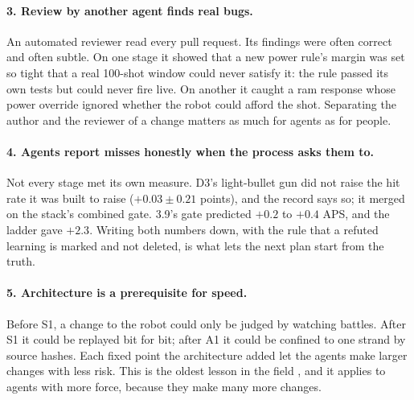 \documentclass[10pt,twocolumn]{article}
\begin{document}
\paragraph{3. Review by another agent finds real bugs.} An automated reviewer read every pull
request. Its findings were often correct and often subtle. On one stage it showed that a new
power rule's margin was set so tight that a real 100-shot window could never satisfy it: the rule
passed its own tests but could never fire live. On another it caught a ram response whose power
override ignored whether the robot could afford the shot. Separating the author and the reviewer
of a change matters as much for agents as for people.

\paragraph{4. Agents report misses honestly when the process asks them to.} Not every stage met its
own measure. D3's light-bullet gun did not raise the hit rate it was built to raise
($+0.03 \pm 0.21$ points), and the record says so; it merged on the stack's combined gate. 3.9's
gate predicted $+0.2$ to $+0.4$ APS, and the ladder gave $+2.3$. Writing both numbers down, with the
rule that a refuted learning is marked and not deleted, is what lets the next plan start from the
truth.

\paragraph{5. Architecture is a prerequisite for speed.} Before S1, a change to the robot could
only be judged by watching battles. After S1 it could be replayed bit for bit; after A1 it could
be confined to one strand by source hashes. Each fixed point the architecture added let the agents
make larger changes with less risk. This is the oldest lesson in the field \cite{brooks1987}, and
it applies to agents with more force, because they make many more changes.
\end{document}

